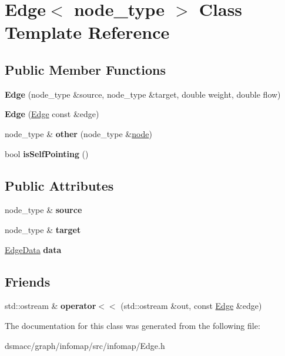 \hypertarget{classEdge}{}\section{Edge$<$ node\+\_\+type $>$ Class Template Reference}
\label{classEdge}
\subsection*{Public Member Functions}
\begin{DoxyCompactItemize}
\item 
\mbox{\label{classEdge_a70062a949cb690cf9eaa2e02cf397d0e}} 
{\bfseries Edge} (node\+\_\+type \&source, node\+\_\+type \&target, double weight, double flow)
\item 
\mbox{\label{classEdge_af03a8e15a122bd3a31d2c5a7a6ca4973}} 
{\bfseries Edge} (\mbox{\hyperlink{classEdge}{Edge}} const \&edge)
\item 
\mbox{\label{classEdge_a07ee40727f918afc51cfe937115ca8dd}} 
node\+\_\+type \& {\bfseries other} (node\+\_\+type \&\mbox{\hyperlink{structnode}{node}})
\item 
\mbox{\label{classEdge_a24c2c1f4700c936dd54212195365a85b}} 
bool {\bfseries is\+Self\+Pointing} ()
\end{DoxyCompactItemize}
\subsection*{Public Attributes}
\begin{DoxyCompactItemize}
\item 
\mbox{\label{classEdge_af26657dafba2b68be5dd618a29e90d32}} 
node\+\_\+type \& {\bfseries source}
\item 
\mbox{\label{classEdge_a2179c8300af25cfd4c9808acd071e4d4}} 
node\+\_\+type \& {\bfseries target}
\item 
\mbox{\label{classEdge_a5ede4e1f06ef4c9c2745ede6041578a3}} 
\mbox{\hyperlink{structEdgeData}{Edge\+Data}} {\bfseries data}
\end{DoxyCompactItemize}
\subsection*{Friends}
\begin{DoxyCompactItemize}
\item 
\mbox{\label{classEdge_ac72878b9f65eaae932db47be729c3087}} 
std\+::ostream \& {\bfseries operator$<$$<$} (std\+::ostream \&out, const \mbox{\hyperlink{classEdge}{Edge}} \&edge)
\end{DoxyCompactItemize}


The documentation for this class was generated from the following file\+:\begin{DoxyCompactItemize}
\item 
dsmacc/graph/infomap/src/infomap/Edge.\+h\end{DoxyCompactItemize}
